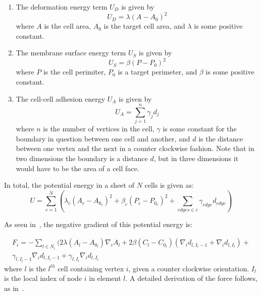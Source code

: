 \begin{enumerate}
\item The deformation energy term $U_D$ is given by \\ 
\begin{equation}
U_D = \lambda(A - A_0)^2
\end{equation}
 where $A$ is the cell area, $A_0$ is the target cell area, and $\lambda$ is some positive constant.
\item The membrane surface energy term $U_S$ is given by
\begin{equation}
U_S = \beta(P - P_0)^2
\end{equation}
 where $P$ is the cell perimiter, $P_0$ is a target perimeter, and $\beta$ is some positive constant.
\item The cell-cell adhesion energy $U_A$ is given by
\begin{equation}U_A = \displaystyle\sum\limits_{j = 1}^{n}\gamma_{j}d_{j}\end{equation}
where $n$ is the number of vertices in the cell, $\gamma$ is some constant for the boundary in question between one cell and another, and $d$ is the distance between one vertex and the next in a counter clockwise fashion. Note that in two dimensions the boundary is a distance $d$, but in three dimensions it would have to be the area of a cell face. 
\end{enumerate}

In total, the potential energy in a sheet of $N$ cells is given as:
\begin{equation*}
U = \sum\limits_{c = 1}^N\left(\lambda_c(A_c - A_{0_c})^2 + \beta_c(P_c - P_{0_c})^2 + \sum_{edges\in c}\gamma_{edge}d_{edge}\right)
\end{equation*}

 As seen in~\cite{ChasteMain}, the negative gradient of this potential energy is:

\begin{equation}
\label{eq:force}
\begin{split}
F_i = -\displaystyle\sum_{l\in N_i}(2\lambda(A_l - A_{0_l})\nabla_iA_l + 2\beta(C_l - C_{0_l})(\nabla_i d_{l, I_l-1}+\nabla_i d_{l, I_l}) +\\ \gamma_{l, I_l-1}\nabla_i d_{l, I_l-1} + \gamma_{l, I_l}\nabla_i d_{l, I_l}
\end{split}
\end{equation} 
where $l$ is the $l^{th}$ cell containing vertex $i$, given a counter clockwise orientation. $I_l$ is the local index of node $i$ in element $l$. A detailed derivation of the force follows, as in~\cite{ChasteMain}.

